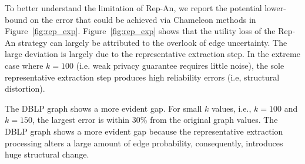 To better understand the limitation of Rep-An, we report the potential lower-bound on the error that could be achieved via Chameleon methods in Figure~\ref{fig:rep_exp}. Figure~\ref{fig:rep_exp} shows that the utility loss of the Rep-An strategy can largely be attributed to the overlook of edge uncertainty. 
The large deviation is largely due to the representative extraction step. In the extreme case where $k=100$ (i.e. weak privacy guarantee requires little noise), the sole representative extraction step produces high reliability errors (i.e, structural distortion). 

The \textsc{DBLP} graph shows a more evident gap. For small $k$ values, i.e., $k=100$ and $k=150$, the largest error is within 30\% from the original graph values. The \textsc{DBLP} graph shows a more evident gap because the representative extraction processing alters a large amount of edge probability, consequently, introduces huge structural change. 




